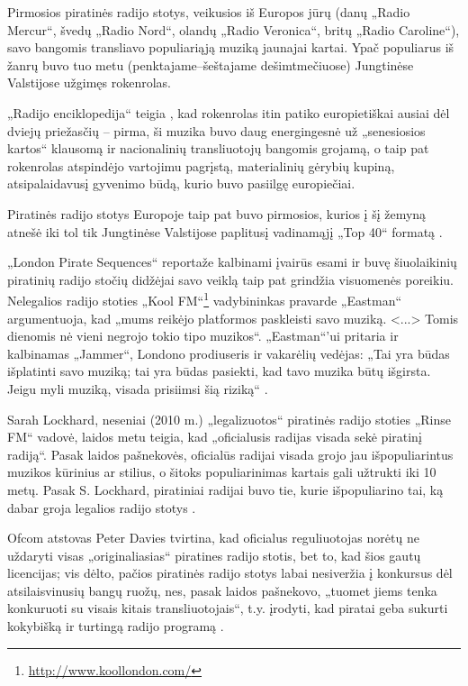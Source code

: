 \documentclass[kursinis-darbas]{vukf}
\begin{document}
Pirmosios piratinės radijo stotys, veikusios iš Europos jūrų (danų „Radio Mercur“, švedų „Radio Nord“, olandų „Radio Veronica“, britų „Radio Caroline“), savo bangomis transliavo populiariąją muziką jaunajai kartai. Ypač populiarus iš žanrų buvo tuo metu (penktajame--šeštajame dešimtmečiuose) Jungtinėse Valstijose užgimęs rokenrolas.

„Radijo enciklopedija“ teigia \cite[p.~237]{chs_encyclopedia_of_radio}, kad rokenrolas itin patiko europietiškai ausiai dėl dviejų priežasčių – pirma, ši muzika buvo daug energingesnė už „senesiosios kartos“ klausomą ir nacionalinių transliuotojų bangomis grojamą, o taip pat rokenrolas atspindėjo vartojimu pagrįstą, materialinių gėrybių kupiną, atsipalaidavusį gyvenimo būdą, kurio buvo pasiilgę europiečiai.

Piratinės radijo stotys Europoje taip pat buvo pirmosios, kurios į šį žemyną atnešė iki tol tik Jungtinėse Valstijose paplitusį vadinamąjį „Top 40“ formatą \cite[p.~237]{chs_encyclopedia_of_radio}.

„London Pirate Sequences“ reportaže kalbinami įvairūs esami ir buvę šiuolaikinių piratinių radijo stočių didžėjai savo veiklą taip pat grindžia visuomenės poreikiu. Nelegalios radijo stoties „Kool FM“\footnote{\url{http://www.koollondon.com/}} vadybininkas pravarde „Eastman“ argumentuoja, kad „mums reikėjo platformos paskleisti savo muziką. <...> Tomis dienomis nė vieni negrojo tokio tipo muzikos“. „Eastman“'ui pritaria ir kalbinamas „Jammer“, Londono prodiuseris ir vakarėlių vedėjas: „Tai yra būdas išplatinti savo muziką; tai yra būdas pasiekti, kad tavo muzika būtų išgirsta. Jeigu myli muziką, visada prisiimsi šią riziką“ \cite{vice_london_pirate_sequences}.

Sarah Lockhard, neseniai (2010 m.) „legalizuotos“ piratinės radijo stoties „Rinse FM“ vadovė, laidos metu teigia, kad „oficialusis radijas visada sekė piratinį radiją“. Pasak laidos pašnekovės, oficialūs radijai visada grojo jau išpopuliarintus muzikos kūrinius ar stilius, o šitoks populiarinimas kartais gali užtrukti iki 10 metų. Pasak S. Lockhard, piratiniai radijai buvo tie, kurie išpopuliarino tai, ką dabar groja legalios radijo stotys \cite{bbc_radio_4_do_pirates_rule_the_air_waves}.

\gls{Ofcom} atstovas Peter Davies tvirtina, kad oficialus reguliuotojas norėtų ne uždaryti visas „originaliasias“ piratines radijo stotis, bet to, kad šios gautų licencijas; vis dėlto, pačios piratinės radijo stotys labai nesiveržia į konkursus dėl atsilaisvinusių bangų ruožų, nes, pasak laidos pašnekovo, „tuomet jiems tenka konkuruoti su visais kitais transliuotojais“, t.y. įrodyti, kad piratai geba sukurti kokybišką ir turtingą radijo programą \cite{bbc_radio_4_do_pirates_rule_the_air_waves}.
\end{document}
